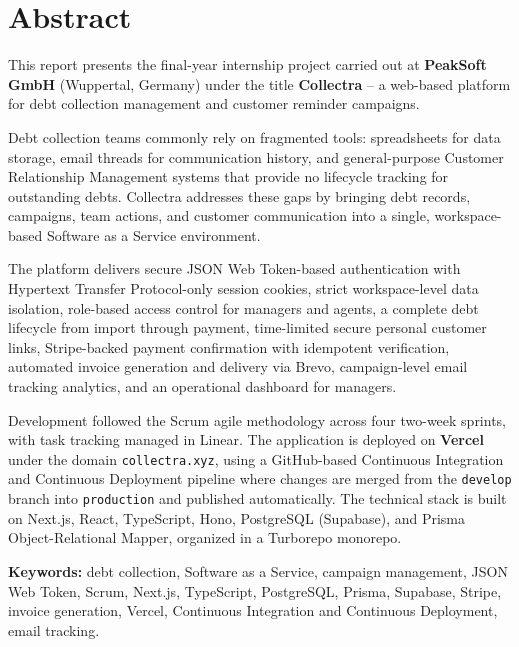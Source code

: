 ﻿\documentclass[12pt,a4paper]{report}
\begin{document}
\clearpage


\chapter*{Abstract}
{}

This report presents the final-year internship project carried out at
\textbf{PeakSoft GmbH} (Wuppertal, Germany) under the title \textbf{Collectra} --
a web-based platform for debt collection management and customer reminder campaigns.

Debt collection teams commonly rely on fragmented tools: spreadsheets for data
storage, email threads for communication history, and general-purpose Customer Relationship Management systems
that provide no lifecycle tracking for outstanding debts.
Collectra addresses these gaps by bringing debt records, campaigns, team actions,
and customer communication into a single, workspace-based Software as a Service environment.

The platform delivers secure JSON Web Token-based authentication with Hypertext Transfer Protocol-only
session cookies,
strict workspace-level data isolation, role-based access control for managers and
agents, a complete debt lifecycle from import through payment, time-limited secure
personal customer links, Stripe-backed payment confirmation with idempotent
verification, automated invoice generation and delivery via Brevo, campaign-level
email tracking analytics, and an operational dashboard for managers.

Development followed the Scrum agile methodology across four two-week sprints, with
task tracking managed in Linear.
The application is deployed on \textbf{Vercel} under the domain
\texttt{collectra.xyz}, using a GitHub-based Continuous Integration and Continuous Deployment pipeline where changes are
merged from the \texttt{develop} branch into \texttt{production} and published
automatically.
The technical stack is built on Next.js, React, TypeScript, Hono, PostgreSQL
(Supabase), and Prisma Object-Relational Mapper, organized in a Turborepo monorepo.

\medskip
\noindent{\color{accentblue}\rule{2.8cm}{0.55pt}}\par\vspace{0.35em}
\noindent\textbf{Keywords:}
debt collection, Software as a Service, campaign management, JSON Web Token, Scrum, Next.js,
TypeScript, PostgreSQL, Prisma, Supabase, Stripe, invoice generation, Vercel,
Continuous Integration and Continuous Deployment, email tracking.
\end{document}
